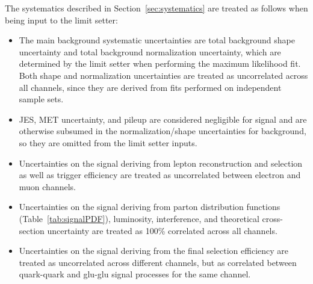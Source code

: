 The systematics described in Section~\ref{sec:systematics} are treated
as follows when being input to the limit setter:
\begin{itemize}
\item The main background systematic uncertainties are total
background shape uncertainty and total background normalization
uncertainty, which are determined by the limit setter when performing
the maximum likelihood fit.
Both shape and normalization uncertainties are
treated as uncorrelated across all channels, since they are derived
from fits performed on independent sample sets.
\item JES, MET uncertainty, and pileup are considered negligible for
signal and are otherwise subsumed in the normalization/shape
uncertainties for background, so they are omitted from the limit setter
inputs.
\item Uncertainties on the signal deriving from lepton reconstruction
and selection as well as trigger efficiency are treated as uncorrelated
between electron and muon channels.
\item Uncertainties on the signal deriving from parton distribution
functions (Table~\ref{tab:signalPDF}), luminosity, interference, and
theoretical cross-section uncertainty are treated as 100\% correlated
across all channels.
\item Uncertainties on the signal deriving from the final selection
efficiency are treated as uncorrelated across different channels, but as
correlated between quark-quark and glu-glu signal processes for the same
channel.
\end{itemize}

